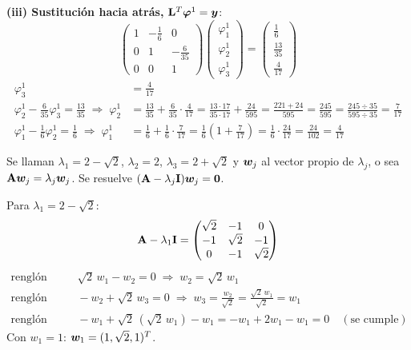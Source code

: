 \textbf{(iii) Sustitución hacia atrás,} $\mathbf{L}^T\bm{\varphi}^1 = \bm{y}$:
\[
  \begin{pmatrix} 1 & -\frac16 & 0\\ 0 & 1 & -\frac{6}{35}\\ 0 & 0 & 1 \end{pmatrix}
  \begin{pmatrix} \varphi_1^1\\ \varphi_2^1\\ \varphi_3^1 \end{pmatrix} = \begin{pmatrix} \frac16\\[3pt] \frac{13}{35}\\[3pt] \frac{4}{17} \end{pmatrix}
\]
\begin{align*}
  \varphi_3^1 &= \frac{4}{17}\\
  \varphi_2^1 - \frac{6}{35}\varphi_3^1 = \frac{13}{35} \;\Longrightarrow\; \varphi_2^1
    &= \frac{13}{35} + \frac{6}{35}\cdot\frac{4}{17}
     = \frac{13\cdot 17}{35\cdot 17} + \frac{24}{595}
     = \frac{221 + 24}{595} = \frac{245}{595} = \frac{245 \div 35}{595 \div 35} = \frac{7}{17}\\
  \varphi_1^1 - \frac16 \varphi_2^1 = \frac16 \;\Longrightarrow\; \varphi_1^1
    &= \frac16 + \frac16\cdot\frac{7}{17} = \frac16\left(1 + \frac{7}{17}\right)
     = \frac{1}{6}\cdot\frac{24}{17} = \frac{24}{102} = \frac{4}{17}
\end{align*}



Se llaman $\lambda_1 = 2 - \sqrt2$, $\lambda_2 = 2$, $\lambda_3 = 2 + \sqrt2$ y $\bm{w}_j$ al vector propio de $\lambda_j$,
o sea $\mathbf{A}\bm{w}_j = \lambda_j\bm{w}_j$. Se resuelve $(\mathbf{A} - \lambda_j\mathbf{I})\bm{w}_j = \bm{0}$.

Para $\lambda_1 = 2 - \sqrt2$:
\[
\mathbf{A} - \lambda_1\mathbf{I} =
\begin{pmatrix} \sqrt2 & -1 & 0\\ -1 & \sqrt2 & -1\\ 0 & -1 & \sqrt2 \end{pmatrix}
\]
\begin{align*}
	\text{renglón 1:}&\quad \sqrt2\,w_1 - w_2 = 0 \;\Longrightarrow\; w_2 = \sqrt2\,w_1\\
	\text{renglón 3:}&\quad -w_2 + \sqrt2\,w_3 = 0 \;\Longrightarrow\; w_3 = \frac{w_2}{\sqrt2} = \frac{\sqrt2\,w_1}{\sqrt2} = w_1\\
	\text{renglón 2:}&\quad -w_1 + \sqrt2\,(\sqrt2\,w_1) - w_1 = -w_1 + 2w_1 - w_1 = 0 \quad (\text{se cumple})
\end{align*}
Con $w_1 = 1$: $\bm{w}_1 = (1, \sqrt2, 1)^T$.

